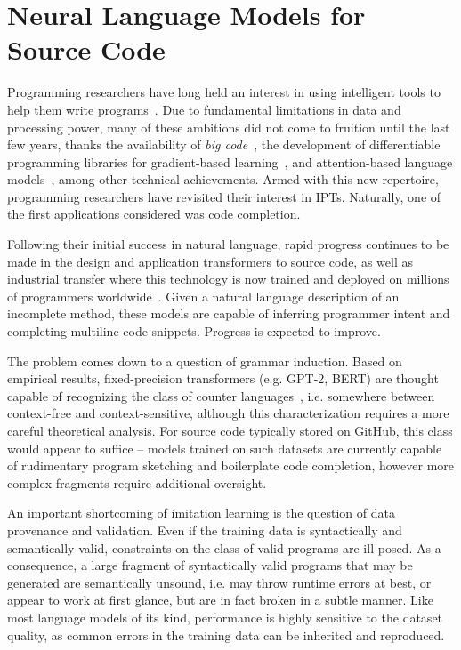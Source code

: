 \documentclass[10pt]{article}
\begin{document}
  \section{Neural Language Models for Source Code}

Programming researchers have long held an interest in using intelligent tools to help them write programs~\cite{bras1993artificial}. Due to fundamental limitations in data and processing power, many of these ambitions did not come to fruition until the last few years, thanks the availability of \textit{big code}~\cite{allamanis2018survey}, the development of differentiable programming libraries for gradient-based learning~\cite{baydin2018automatic}, and attention-based language models~\cite{vaswani2017attention}, among other technical achievements. Armed with this new repertoire, programming researchers have revisited their interest in IPTs. Naturally, one of the first applications considered was code completion.

 Following their initial success in natural language, rapid progress continues to be made in the design and application transformers to source code, as well as industrial transfer where this technology is now trained and deployed on millions of programmers worldwide~\cite{chen2021evaluating}. Given a natural language description of an incomplete method, these models are capable of inferring programmer intent and completing multiline code snippets. Progress is expected to improve.

The problem comes down to a question of grammar induction. Based on empirical results, fixed-precision transformers (e.g. GPT-2, BERT) are thought capable of recognizing the class of counter languages~\cite{bhattamishra2020ability}, i.e. somewhere between context-free and context-sensitive, although this characterization requires a more careful theoretical analysis. For source code typically stored on GitHub, this class would appear to suffice -- models trained on such datasets are currently capable of rudimentary program sketching and boilerplate code completion, however more complex fragments require additional oversight.

An important shortcoming of imitation learning is the question of data provenance and validation. Even if the training data is syntactically and semantically valid, constraints on the class of valid programs are ill-posed. As a consequence, a large fragment of syntactically valid programs that may be generated are semantically unsound, i.e. may throw runtime errors at best, or appear to work at first glance, but are in fact broken in a subtle manner. Like most language models of its kind, performance is highly sensitive to the dataset quality, as common errors in the training data can be inherited and reproduced.
\end{document}
